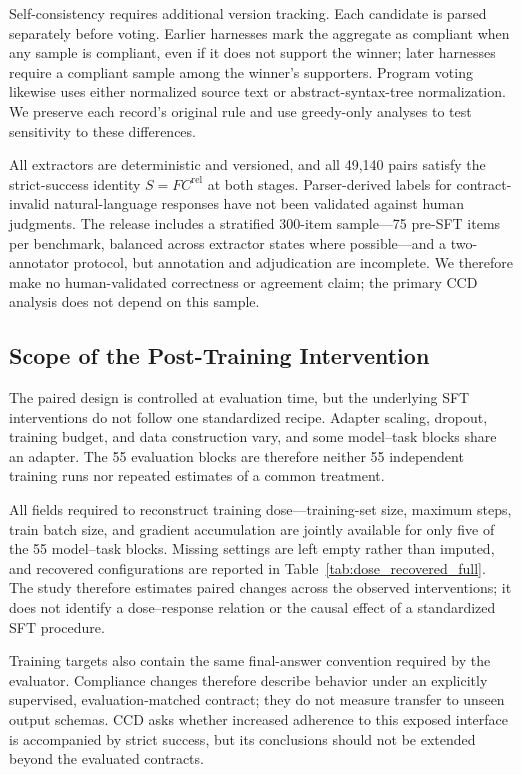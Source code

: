 \documentclass{article}
\begin{document}
Self-consistency requires additional version tracking. Each candidate is parsed separately before voting. Earlier harnesses mark the aggregate as compliant when any sample is compliant, even if it does not support the winner; later harnesses require a compliant sample among the winner's supporters. Program voting likewise uses either normalized source text or abstract-syntax-tree normalization. We preserve each record's original rule and use greedy-only analyses to test sensitivity to these differences.

All extractors are deterministic and versioned, and all 49,140 pairs satisfy the strict-success identity \(S=FC^{\mathrm{rel}}\) at both stages. Parser-derived labels for contract-invalid natural-language responses have not been validated against human judgments. The release includes a stratified 300-item sample---75 pre-SFT items per benchmark, balanced across extractor states where possible---and a two-annotator protocol, but annotation and adjudication are incomplete. We therefore make no human-validated correctness or agreement claim; the primary CCD analysis does not depend on this sample.

\subsection{Scope of the Post-Training Intervention}

The paired design is controlled at evaluation time, but the underlying SFT interventions do not follow one standardized recipe. Adapter scaling, dropout, training budget, and data construction vary, and some model--task blocks share an adapter. The 55 evaluation blocks are therefore neither 55 independent training runs nor repeated estimates of a common treatment.

All fields required to reconstruct training dose---training-set size, maximum steps, train batch size, and gradient accumulation are jointly available for only five of the 55 model--task blocks. Missing settings are left empty rather than imputed, and recovered configurations are reported in Table~\ref{tab:dose_recovered_full}. The study therefore estimates paired changes across the observed interventions; it does not identify a dose--response relation or the causal effect of a standardized SFT procedure.

Training targets also contain the same final-answer convention required by the evaluator. Compliance changes therefore describe behavior under an explicitly supervised, evaluation-matched contract; they do not measure transfer to unseen output schemas. CCD asks whether increased adherence to this exposed interface is accompanied by strict success, but its conclusions should not be extended beyond the evaluated contracts.
\end{document}
